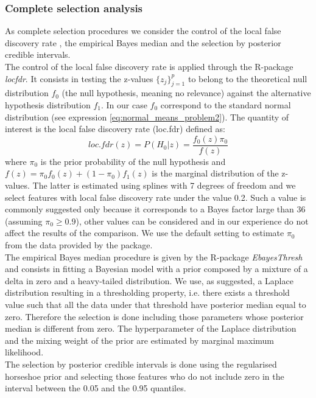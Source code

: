\documentclass[american,]{article}
\theoremstyle{definition}
\begin{document}
\hypertarget{complete-selection}{%
\subsubsection{Complete selection analysis}\label{complete-selection}}
As complete selection procedures we consider the control of the local false discovery rate \citep{paper:efron, efron2012large}, the empirical Bayes median \citep{johnstone2004needles} and the selection by posterior credible intervals. 
\\
The control of the local false discovery rate is applied through the R-package \textit{locfdr}. It consists in testing the z-values $\{z_{j}\}_{j=1}^{p}$ to belong to the theoretical null distribution $f_{0}$ (the null hypothesis, meaning no relevance) against the alternative hypothesis distribution $f_{1}$. In our case $f_{0}$ correspond to the standard normal distribution (see expression \eqref{eq:normal_means_problem2}). The quantity of interest is the local false discovery rate (loc.fdr) defined as:
\
\begin{equation}
loc.fdr(z)=P(H_{0}|z)=\frac{f_{0}(z)\pi_{0}}{f(z)}
\end{equation}
where $\pi_{0}$ is the prior probability of the null hypothesis and $f(z)=\pi_{0}f_{0}(z)+(1-\pi_{0})f_{1}(z)$ is the marginal distribution of the z-values. The latter is estimated using splines with 7 degrees of freedom and we select features with local false discovery rate under the value 0.2. Such a value is commonly suggested only because it corresponds to a Bayes factor large than 36 (assuming $\pi_{0}\geq0.9$), other values can be considered and in our experience do not affect the results of the comparison. We use the default setting to estimate $\pi_{0}$ from the data provided by the package.
\\
The empirical Bayes median procedure is given by the R-package \textit{EbayesThresh} and consists in fitting a Bayesian model with a prior composed by a mixture of a delta in zero and a heavy-tailed distribution. We use, as suggested, a Laplace distribution resulting in a thresholding property, i.e. there exists a threshold value such that all the data under that threshold have posterior median equal to zero. Therefore the selection is done including those parameters whose posterior median is different from zero. The hyperparameter of the Laplace distribution and the mixing weight of the prior are estimated by marginal maximum likelihood. 
\\
The selection by posterior credible intervals is done using the regularised horseshoe prior and selecting those features who do not include zero in the interval between the 0.05 and the 0.95 quantiles.
\end{document}
